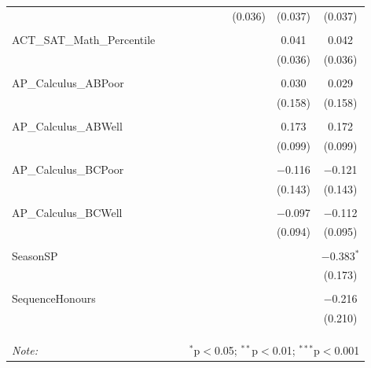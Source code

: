 \begin{table}[!htbp]
\begin{tabular}{@{\extracolsep{5pt}}lccccccccc}
  &  &  &  &  &  &  & (0.036) & (0.037) & (0.037) \\ 
  & & & & & & & & & \\ 
 ACT\_SAT\_Math\_Percentile &  &  &  &  &  &  &  & 0.041 & 0.042 \\ 
  &  &  &  &  &  &  &  & (0.036) & (0.036) \\ 
  & & & & & & & & & \\ 
 AP\_Calculus\_ABPoor &  &  &  &  &  &  &  & 0.030 & 0.029 \\ 
  &  &  &  &  &  &  &  & (0.158) & (0.158) \\ 
  & & & & & & & & & \\ 
 AP\_Calculus\_ABWell &  &  &  &  &  &  &  & 0.173 & 0.172 \\ 
  &  &  &  &  &  &  &  & (0.099) & (0.099) \\ 
  & & & & & & & & & \\ 
 AP\_Calculus\_BCPoor &  &  &  &  &  &  &  & $-$0.116 & $-$0.121 \\ 
  &  &  &  &  &  &  &  & (0.143) & (0.143) \\ 
  & & & & & & & & & \\ 
 AP\_Calculus\_BCWell &  &  &  &  &  &  &  & $-$0.097 & $-$0.112 \\ 
  &  &  &  &  &  &  &  & (0.094) & (0.095) \\ 
  & & & & & & & & & \\ 
 SeasonSP &  &  &  &  &  &  &  &  & $-$0.383$^{*}$ \\ 
  &  &  &  &  &  &  &  &  & (0.173) \\ 
  & & & & & & & & & \\ 
 SequenceHonours &  &  &  &  &  &  &  &  & $-$0.216 \\ 
  &  &  &  &  &  &  &  &  & (0.210) \\ 
  & & & & & & & & & \\ 
\hline \\[-1.8ex] 
\hline 
\hline \\[-1.8ex] 
\textit{Note:}  & \multicolumn{9}{r}{$^{*}$p$<$0.05; $^{**}$p$<$0.01; $^{***}$p$<$0.001} \\ 
\end{tabular} 
\end{table} 
